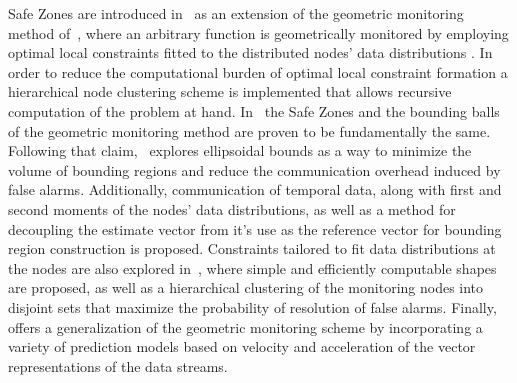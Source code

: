 Safe Zones are introduced in~\cite{Keren2013SafeZones} as an extension of the geometric monitoring method of~\cite{Sharfman2006GM},
where an arbitrary function is geometrically monitored by employing optimal local constraints fitted to the distributed nodes' data distributions . In order to reduce the computational burden of optimal local constraint formation a hierarchical node clustering scheme is implemented that allows recursive computation of the problem at hand. In~\cite{Samoladas2013Unification} the Safe Zones and the bounding balls of the geometric monitoring method are proven to be fundamentally the same. Following that claim,~\cite{Sharfman2012ShapeSensGM} explores ellipsoidal bounds as a way to minimize the volume of bounding regions and reduce the communication overhead induced by false alarms. Additionally, communication of temporal data, along with first and second moments of the nodes' data distributions, as well as a method for decoupling the estimate vector from it's use as the reference vector for bounding region construction is proposed. Constraints tailored to fit data distributions at the nodes are also explored in~\cite{Keren2014GMHetStreams}, where simple and efficiently computable shapes are proposed, as well as a hierarchical clustering of the monitoring nodes into disjoint sets that maximize the probability of resolution of false alarms. Finally,~\cite{GiatrakosPredictionGM} offers a generalization of the geometric monitoring scheme by incorporating a variety of prediction models based on velocity and acceleration of the vector representations of the data streams.

